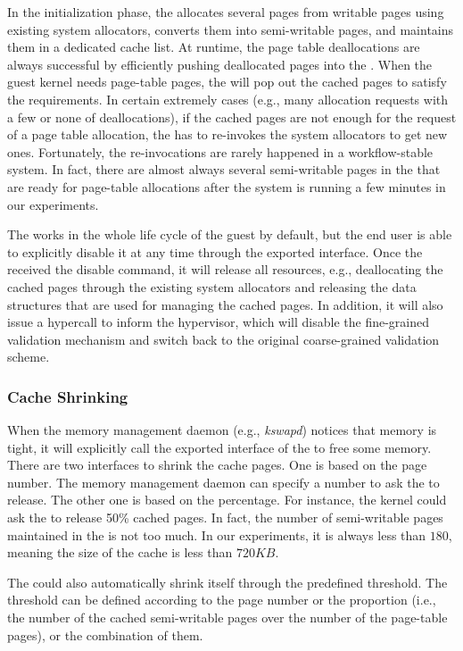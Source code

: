 In the initialization phase, the \cache allocates several pages from writable pages using existing system allocators, converts them into semi-writable pages, and maintains them in a dedicated cache list.
At runtime, the page table deallocations are always successful by efficiently pushing deallocated pages into the \cache.
When the guest kernel needs page-table pages, the \cache  will pop out the cached pages to satisfy the requirements.
In certain extremely cases (e.g., many allocation requests with a few or none of deallocations), if the cached pages are not enough for the request of a page table allocation, the \cache has to re-invokes the system allocators to get new ones.
Fortunately, the re-invocations are rarely happened in a workflow-stable system.
In fact, there are almost always several semi-writable pages in the \cache that are ready for page-table allocations after the system is running a few minutes in our experiments.

The \cache works in the whole life cycle of the guest by default, but the end  user is able to explicitly disable it at any time through the exported interface.
Once the \cache received the disable command, it will release all resources, e.g., deallocating the cached pages through the existing system allocators and releasing the data structures that are used for managing the cached pages.
In addition, it will also issue a hypercall to inform the hypervisor, which will disable the fine-grained validation mechanism and switch back to the original coarse-grained validation scheme.

\subsubsection{Cache Shrinking}
When the memory management daemon (e.g., \emph{kswapd}) notices that memory is tight, it will explicitly call the exported interface of the \cache to free some memory.
There are two interfaces to shrink the cache pages. One is based on the page number. The memory management daemon can specify a number to ask the \cache to release.
The other one is based on the percentage. For instance, the kernel could ask the \cache to release 50\% cached pages.
In fact, the number of semi-writable pages maintained in the \cache is not too much. In our experiments, it is always less than $180$, meaning the size of the cache is less than $720KB$.

The \cache could also automatically shrink itself through the predefined threshold.
The threshold can be defined according to the page number or the proportion (i.e., the number of the cached semi-writable pages over the number of the page-table pages), or the combination of them.






